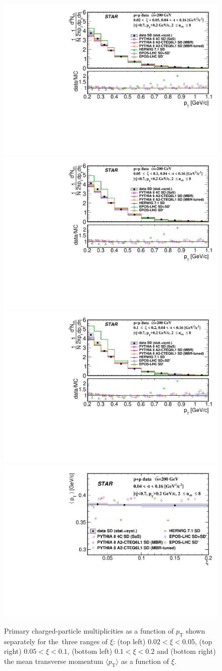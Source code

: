 \begin{figure}[b!]
	\centering
	\includegraphics[width=.49\textwidth,page=1]{chapters/chrgSTAR/img/results/out_pt_ksi_0.pdf}
	\hfill
	\includegraphics[width=.49\textwidth,page=1]{chapters/chrgSTAR/img/results/out_pt_ksi_1.pdf}
	\newline
	\includegraphics[width=.49\textwidth,page=1]{chapters/chrgSTAR/img/results/out_pt_ksi_2.pdf}
	\hfill
	\includegraphics[width=.49\textwidth,page=1]{chapters/chrgSTAR/img/results/mean_pt_xi.pdf}
	\caption{Primary charged-particle multiplicities as a function of $p_\textrm{T}$ shown separately for the~three ranges of  $\xi$: (top left) $0.02<\xi<0.05$, (top right) $0.05<\xi<0.1$, (bottom left) $0.1<\xi<0.2$ and (bottom right) the mean transverse momentum $\langle p_\textrm{T}\rangle$ as a function of $\xi$.}
	\label{fig:results_star_pt}
\end{figure}

